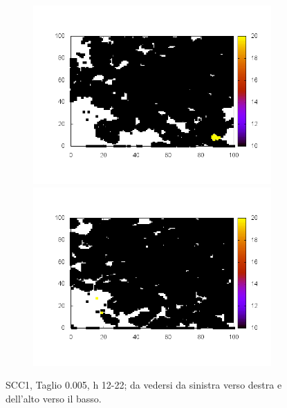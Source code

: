 \documentclass[10pt,a4paper]{article}
\begin{document}
\begin{figure}
\begin{subfigure}[b]{1\textwidth}
\end{subfigure}
\begin{subfigure}[b]{1\textwidth}
\includegraphics[scale=.3]{./img/stampe/scc1/21.png}
\includegraphics[scale=.3]{./img/stampe/scc1/22.png}
\end{subfigure}
\caption{SCC1, Taglio 0.005, h 12-22; da vedersi da sinistra verso destra e dell'alto verso il basso.}
\end{figure}
\end{document}
